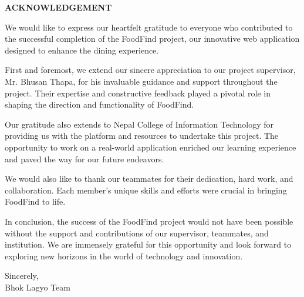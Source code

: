 \documentclass[12pt, a4paper, oneside]{article}
\begin{document}


\large
\begin{center}
	\textbf{ACKNOWLEDGEMENT}
\end{center}
\normalsize
We would like to express our heartfelt gratitude to everyone who contributed to the successful completion of the FoodFind project, our innovative web application designed to enhance the dining experience.

First and foremost, we extend our sincere appreciation to our project supervisor, Mr. Bhusan Thapa, for his invaluable guidance and support throughout the project. Their expertise and constructive feedback played a pivotal role in shaping the direction and functionality of FoodFind.

Our gratitude also extends to Nepal College of Information Technology for providing us with the platform and resources to undertake this project. The opportunity to work on a real-world application enriched our learning experience and paved the way for our future endeavors.

We would also like to thank our teammates for their dedication, hard work, and collaboration. Each member's unique skills and efforts were crucial in bringing FoodFind to life.

In conclusion, the success of the FoodFind project would not have been possible without the support and contributions of our supervisor, teammates, and institution. We are immensely grateful for this opportunity and look forward to exploring new horizons in the world of technology and innovation.

\begin{flushleft}
Sincerely, \\
Bhok Lagyo Team
\end{flushleft}
\pagebreak
\end{document}
